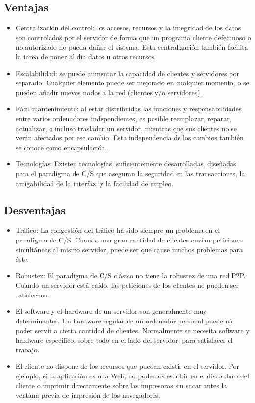 \subsection{Ventajas}
\begin{itemize}
	\item Centralización del control: los accesos, recursos y la integridad de los datos son controlados por el servidor de forma que un programa cliente defectuoso o no autorizado no pueda dañar el sistema. Esta centralización también facilita la tarea de poner al día datos u otros recursos.
	\item Escalabilidad: se puede aumentar la capacidad de clientes y servidores por separado. Cualquier elemento puede ser mejorado en cualquier momento, o se pueden añadir nuevos nodos a la red (clientes y/o servidores).
	\item Fácil mantenimiento: al estar distribuidas las funciones y responsabilidades entre varios ordenadores independientes, es posible reemplazar, reparar, actualizar, o incluso trasladar un servidor, mientras que sus clientes no se verán afectados por ese cambio. Esta independencia de los cambios también se conoce como encapsulación.
	\item Tecnologías: Existen tecnologías, suficientemente desarrolladas, diseñadas para el paradigma de C/S que aseguran la seguridad en las transacciones, la amigabilidad de la interfaz, y la facilidad de empleo.
\end{itemize}

\subsection{Desventajas}
\begin{itemize}
	\item Tráfico: La congestión del tráfico ha sido siempre un problema en el paradigma de C/S. Cuando una gran cantidad de clientes envían peticiones simultáneas al mismo servidor, puede ser que cause muchos problemas para éste.
	\item Robustez: El paradigma de C/S clásico no tiene la robustez de una red P2P. Cuando un servidor está caído, las peticiones de los clientes no pueden ser satisfechas.
	\item El software y el hardware de un servidor son generalmente muy determinantes. Un hardware regular de un ordenador personal puede no poder servir a cierta cantidad de clientes. Normalmente se necesita software y hardware específico, sobre todo en el lado del servidor, para satisfacer el trabajo.
	\item El cliente no dispone de los recursos que puedan existir en el servidor. Por ejemplo, si la aplicación es una Web, no podemos escribir en el disco duro del cliente o imprimir directamente sobre las impresoras sin sacar antes la ventana previa de impresión de los navegadores.
\end{itemize}

